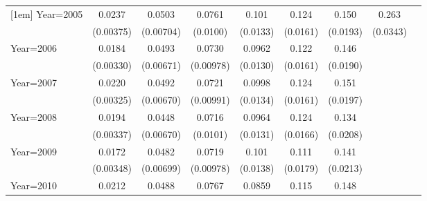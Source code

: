 \begin{table}[htbp]
\begin{tabular}{l*{8}{c}}
[1em]
Year=2005           &      0.0237\sym{***}&      0.0503\sym{***}&      0.0761\sym{***}&       0.101\sym{***}&       0.124\sym{***}&       0.150\sym{***}&       0.263\sym{***}&                     \\
                    &   (0.00375)         &   (0.00704)         &    (0.0100)         &    (0.0133)         &    (0.0161)         &    (0.0193)         &    (0.0343)         &                     \\
[1em]
Year=2006           &      0.0184\sym{***}&      0.0493\sym{***}&      0.0730\sym{***}&      0.0962\sym{***}&       0.122\sym{***}&       0.146\sym{***}&                     &                     \\
                    &   (0.00330)         &   (0.00671)         &   (0.00978)         &    (0.0130)         &    (0.0161)         &    (0.0190)         &                     &                     \\
[1em]
Year=2007           &      0.0220\sym{***}&      0.0492\sym{***}&      0.0721\sym{***}&      0.0998\sym{***}&       0.124\sym{***}&       0.151\sym{***}&                     &                     \\
                    &   (0.00325)         &   (0.00670)         &   (0.00991)         &    (0.0134)         &    (0.0161)         &    (0.0197)         &                     &                     \\
[1em]
Year=2008           &      0.0194\sym{***}&      0.0448\sym{***}&      0.0716\sym{***}&      0.0964\sym{***}&       0.124\sym{***}&       0.134\sym{***}&                     &                     \\
                    &   (0.00337)         &   (0.00670)         &    (0.0101)         &    (0.0131)         &    (0.0166)         &    (0.0208)         &                     &                     \\
[1em]
Year=2009           &      0.0172\sym{***}&      0.0482\sym{***}&      0.0719\sym{***}&       0.101\sym{***}&       0.111\sym{***}&       0.141\sym{***}&                     &                     \\
                    &   (0.00348)         &   (0.00699)         &   (0.00978)         &    (0.0138)         &    (0.0179)         &    (0.0213)         &                     &                     \\
[1em]
Year=2010           &      0.0212\sym{***}&      0.0488\sym{***}&      0.0767\sym{***}&      0.0859\sym{***}&       0.115\sym{***}&       0.148\sym{***}&                     &                     \\

\end{tabular}
\end{table}
